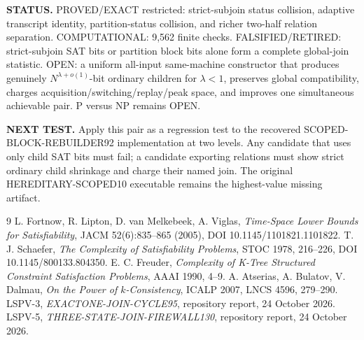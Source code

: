 \documentclass[11pt]{article}
\begin{document}
\textbf{STATUS.}  PROVED/EXACT restricted: strict-subjoin status collision,
adaptive transcript identity, partition-status collision, and richer
two-half relation separation.  COMPUTATIONAL: 9,562 finite checks.
FALSIFIED/RETIRED: strict-subjoin SAT bits or partition block bits alone
form a complete global-join statistic.  OPEN: a uniform all-input
same-machine constructor that produces genuinely
\(N^{\lambda+o(1)}\)-bit ordinary children for \(\lambda<1\), preserves
global compatibility, charges acquisition/switching/replay/peak space, and
improves one simultaneous achievable pair.  P versus NP remains OPEN.

\textbf{NEXT TEST.}  Apply this pair as a regression test to the recovered
SCOPED-BLOCK-REBUILDER92 implementation at two levels.  Any candidate that
uses only child SAT bits must fail; a candidate exporting relations must
show strict ordinary child shrinkage and charge their named join.  The
original HEREDITARY-SCOPED10 executable remains the highest-value missing
artifact.

\begin{thebibliography}{9}
 L. Fortnow, R. Lipton, D. van Melkebeek, A. Viglas,
\emph{Time-Space Lower Bounds for Satisfiability}, JACM 52(6):835--865
(2005), DOI 10.1145/1101821.1101822.
 T. J. Schaefer, \emph{The Complexity of Satisfiability
Problems}, STOC 1978, 216--226, DOI 10.1145/800133.804350.
 E. C. Freuder, \emph{Complexity of K-Tree Structured
Constraint Satisfaction Problems}, AAAI 1990, 4--9.
 A. Atserias, A. Bulatov, V. Dalmau, \emph{On the Power of
\(k\)-Consistency}, ICALP 2007, LNCS 4596, 279--290.
 LSPV-3, \emph{EXACTONE-JOIN-CYCLE95}, repository report,
24 October 2026.
 LSPV-5, \emph{THREE-STATE-JOIN-FIREWALL130}, repository
report, 24 October 2026.
\end{thebibliography}
\end{document}
